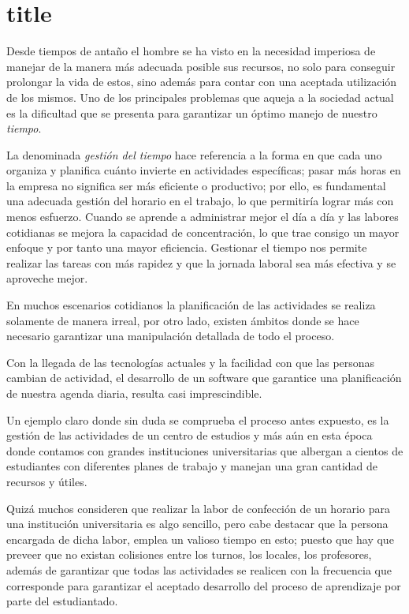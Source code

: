 \part{title}%
\begin{introduction}
	Desde tiempos de antaño el hombre se ha visto en la necesidad imperiosa de manejar de la manera más adecuada posible sus recursos, no solo para conseguir prolongar la vida de estos, sino además para contar con una aceptada utilización de los mismos. Uno de los principales problemas que aqueja a la sociedad actual es la dificultad que se presenta para garantizar un óptimo manejo de nuestro \textit{tiempo}.
	
	La denominada \textit{gestión del tiempo} hace referencia a la forma en que cada uno organiza y planifica cuánto invierte en actividades específicas; pasar más horas en la empresa no significa ser más eficiente o productivo; por ello, es fundamental una adecuada gestión del horario en el trabajo, lo que permitiría lograr más con menos esfuerzo. Cuando se aprende a administrar mejor el día a día y las labores cotidianas se mejora la capacidad de concentración, lo que trae consigo un mayor enfoque y por tanto una mayor eficiencia. Gestionar el tiempo nos permite realizar las tareas con más rapidez y que la jornada laboral sea más efectiva y se aproveche mejor.
	
	En muchos escenarios cotidianos la planificación de las actividades se realiza solamente de manera irreal, por otro lado, existen ámbitos donde se hace necesario garantizar una manipulación detallada de todo el proceso.
	
	Con la llegada de las tecnologías actuales y la facilidad con que las personas cambian de actividad, el desarrollo de un software que garantice una planificación de nuestra agenda diaria, resulta casi imprescindible.
	
	Un ejemplo claro donde sin duda se comprueba el proceso antes expuesto, es la gestión de las actividades de un centro de estudios y más aún en esta época donde contamos con grandes instituciones universitarias que albergan a cientos de estudiantes con diferentes planes de trabajo y manejan una gran cantidad de recursos y útiles.
	
	Quizá muchos consideren que realizar la labor de confección de un horario para una institución universitaria es algo sencillo, pero cabe destacar que la persona encargada de dicha labor, emplea un valioso tiempo en esto; puesto que hay que preveer que no existan colisiones entre los turnos, los locales, los profesores, además de garantizar que todas las actividades se realicen con la frecuencia que corresponde para garantizar el aceptado desarrollo del proceso de aprendizaje por parte del estudiantado.
	

\end{introduction}
